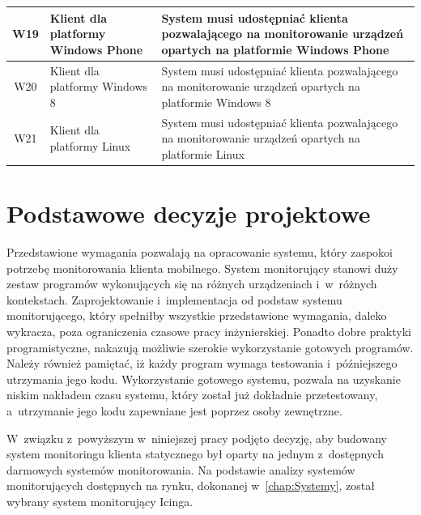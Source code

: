 \begin{longtable}[c]{|c||p{3.5cm}|p{9cm}|}
  W19 & \raggedright{Klient dla platformy Windows Phone} & \raggedright{System musi udostępniać klienta pozwalającego na monitorowanie urządzeń opartych na platformie Windows Phone} \tabularnewline 
  \hline

  W20 & \raggedright{Klient dla platformy Windows 8} & \raggedright{System musi udostępniać klienta pozwalającego na monitorowanie urządzeń opartych na platformie Windows 8} \tabularnewline
  \hline

  W21 & \raggedright{Klient dla platformy Linux} & \raggedright{System musi udostępniać klienta pozwalającego na monitorowanie urządzeń opartych na platformie Linux} \tabularnewline
  \hline
\end{longtable}

\section[Decyzje projektowe][Podstawowe decyzje projektowe]{Podstawowe decyzje projektowe}

Przedstawione wymagania pozwalają na opracowanie systemu, który
zaspokoi potrzebę monitorowania klienta mobilnego. System monitorujący
stanowi duży zestaw programów wykonujących się na różnych urządzeniach
i~w~różnych kontekstach. Zaprojektowanie i~implementacja od podstaw
systemu monitorującego, który spełniłby wszystkie przedstawione
wymagania, daleko wykracza, poza ograniczenia czasowe pracy
inżynierskiej. Ponadto dobre praktyki programistyczne, nakazują
możliwie szerokie wykorzystanie gotowych programów. Należy również
pamiętać, iż każdy program wymaga testowania i~późniejszego utrzymania
jego kodu. Wykorzystanie gotowego systemu, pozwala na uzyskanie niskim
nakładem czasu systemu, który został już dokładnie przetestowany,
a~utrzymanie jego kodu zapewniane jest poprzez osoby zewnętrzne.

W~związku z~powyższym w~niniejszej pracy podjęto decyzję, aby budowany
system monitoringu klienta statycznego był oparty na jednym
z~dostępnych darmowych systemów monitorowania. Na podstawie analizy
systemów monitorujących dostępnych na rynku, dokonanej
w~\ref{chap:Systemy}, został wybrany system monitorujący Icinga.

